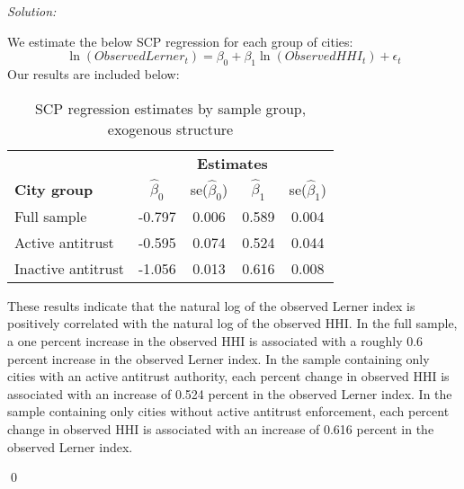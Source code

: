 \documentclass[12pt]{article}
\newenvironment{problem}[2][Problem]{\begin{trivlist}
\item[\hskip \labelsep {\bfseries #1}\hskip \labelsep {\bfseries #2.}]}{\end{trivlist}}
\newenvironment{sol}
    {\emph{Solution:}
    }
    {
    \qed
    }
\begin{document}
\begin{problem}{2}
\end{problem}
\begin{sol}
   We estimate the below SCP regression for each group of cities:
    \[\ln(ObservedLerner_t) = \beta_0 + \beta_1 \ln(ObservedHHI_t) + \epsilon_t\]
    Our results are included below:
    \begin{table}[!ht] %
      \centering %
      \begin{tabular}{l c c c c} %
      \toprule %
      & \multicolumn{4}{c}{\textbf{Estimates}} \\ %
      \cmidrule(l){2-5} %
      \textbf{City group} & $\hat{\beta}_0$ & se($\hat{\beta}_0$) & $\hat{\beta}_1$ & se($\hat{\beta}_1$)\\ %
      \midrule %
      Full sample & -0.797 & 0.006 & 0.589 & 0.004 \\ %
      Active antitrust & -0.595 & 0.074 & 0.524 & 0.044 \\ %
      Inactive antitrust & -1.056 & 0.013 & 0.616 & 0.008 \\ %
      \bottomrule %
      \end{tabular}
      \caption{SCP regression estimates by sample group, exogenous structure} %
      \label{tab:reg_table} %
      \end{table}
      These results indicate that the natural log of the observed Lerner index is positively correlated with the natural log of the observed HHI. In the full sample, a one percent increase in the observed HHI is associated with a roughly 0.6 percent increase in the observed Lerner index. In the sample containing only cities with an active antitrust authority, each percent change in observed HHI is associated with an increase of 0.524 percent in the observed Lerner index. In the sample containing only cities without active antitrust enforcement, each percent change in observed HHI is associated with an increase of 0.616 percent in the observed Lerner index. 


\end{sol}
\end{document}
